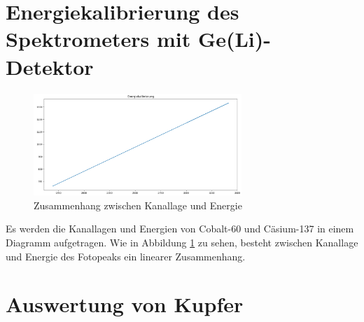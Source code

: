 \documentclass[12pt,german]{article}
\begin{document}
    \section{Energiekalibrierung des Spektrometers mit Ge(Li)-Detektor}
    \begin{figure}[H]
        \centering
        \includegraphics[width=0.7\textwidth]{pics/energiekalibrierung.png}
        \caption{Zusammenhang zwischen Kanallage und Energie}
        \label{fig:kanalenergie}
    \end{figure}
    Es werden die Kanallagen und Energien von Cobalt-60 und Cäsium-137 in einem Diagramm aufgetragen.
    Wie in Abbildung \ref{fig:kanalenergie} zu sehen, besteht zwischen Kanallage und  Energie des Fotopeaks ein linearer Zusammenhang.

    \section{Auswertung von Kupfer}
\end{document}
